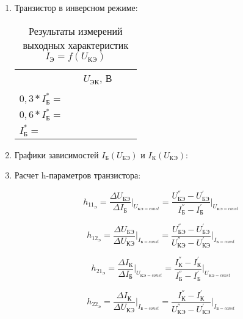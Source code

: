 \begin{enumerate}
\item
Транзистор в инверсном режиме:

\begin{table} [h!]
  \caption{Результаты измерений выходных характеристик $ I_{\text{Э}} = f(U_{\text{КЭ}})$}
  \begin{tabular}{| p{3cm} | p{1.5cm} | p{1.5cm} | p{1.5cm} | p{1.5cm} | p{1.5cm} | p{1.5cm}l | }
    \hline
    \centering \multirow{2}{*}{ $ I_{\text{Б}} $, мА} & \multicolumn{6}{c}{$ U_{\text{ЭК}} $, В} &\\ \cline{2-8}
    & & & & & & &\\
    \hline
    $ 0,3 * I_{\text{Б}}^{*} = $ \hspace{5mm} & & & & & & &\\
    \hline
    $ 0,6 * I_{\text{Б}}^{*} = $ \hspace{5mm} & & & & & & &\\
    \hline
    $ I_{\text{Б}}^{*} = $ \hspace{5mm} & & & & & & &\\
    \hline
  \end{tabular}
\end{table}

\item
Графики зависимостей $ I_{\text{Б}}(U_{\text{БЭ}})$ и  $ I_{\text{К}}(U_{\text{КЭ}})$:
\vspace{100mm}

\item Расчет h-параметров транзистора:

\begin{equation}
  \label{eq:equation1}
  h_{11_{\text{Э}}} = \dfrac{\Delta U_{\text{БЭ}}}{\Delta I_{\text{Б}}} \Bigg|_{U_{\text{КЭ} = const}} = \dfrac{U_{\text{БЭ}}^{''} - U_{\text{БЭ}}^{'}}{I_{\text{Б}}^{''} - I_{\text{Б}}^{'}} \Bigg|_{U_{\text{КЭ} = const}}
\end{equation}

\begin{equation}
  \label{eq:equation2}
  h_{12_{\text{Э}}} = \dfrac{\Delta U_{\text{БЭ}}}{\Delta U_{\text{КЭ}}} \Bigg|_{I_{\text{Б} = const}} = \dfrac{U_{\text{БЭ}}^{''} - U_{\text{БЭ}}^{'}}{U_{\text{КЭ}}^{''} - U_{\text{КЭ}}^{'}} \Bigg|_{I_{\text{Б} = const}}
\end{equation}

\begin{equation}
  \label{eq:equation3}
  h_{21_{\text{Э}}} = \dfrac{\Delta I_{\text{К}}}{\Delta I_{\text{Б}}} \Bigg|_{U_{\text{КЭ} = const}} = \dfrac{I_{\text{К}}^{''} - I_{\text{К}}^{'}}{I_{\text{Б}}^{''} - I_{\text{Б}}^{'}} \Bigg|_{U_{\text{КЭ} = const}}
\end{equation}

\begin{equation}
  \label{eq:equation4}
  h_{22_{\text{Э}}} = \dfrac{\Delta I_{\text{К}}}{\Delta U_{\text{КЭ}}} \Bigg|_{I_{\text{Б} = const}} = \dfrac{I_{\text{К}}^{''} - I_{\text{К}}^{'}}{U_{\text{КЭ}}^{''} - U_{\text{КЭ}}^{'}} \Bigg|_{I_{\text{Б} = const}}
\end{equation}

\vspace{70mm}

\end{enumerate}
